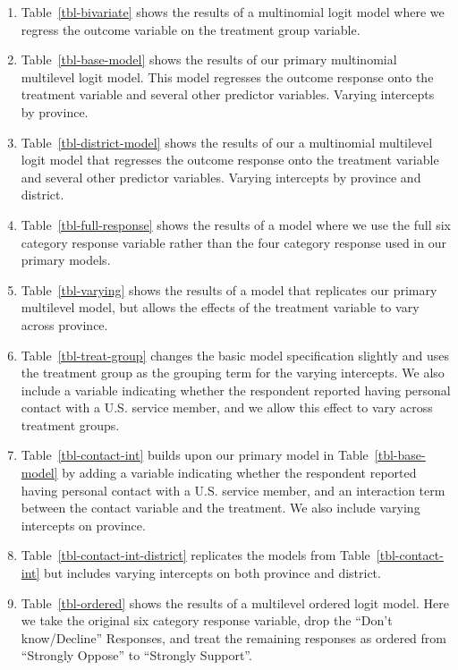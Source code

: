 \documentclass[
  10,
  letterpaper,
  DIV=11,
  numbers=noendperiod]{scrartcl}
\providecommand{\tightlist}{%
  \setlength{\itemsep}{0pt}\setlength{\parskip}{0pt}}\usepackage{longtable,booktabs,array}
\begin{document}
\begin{enumerate}
\def\labelenumi{\arabic{enumi}.}
\tightlist
\item
  Table~\ref{tbl-bivariate} shows the results of a multinomial logit
  model where we regress the outcome variable on the treatment group
  variable.
\item
  Table~\ref{tbl-base-model} shows the results of our primary
  multinomial multilevel logit model. This model regresses the outcome
  response onto the treatment variable and several other predictor
  variables. Varying intercepts by province.
\item
  Table~\ref{tbl-district-model} shows the results of our a multinomial
  multilevel logit model that regresses the outcome response onto the
  treatment variable and several other predictor variables. Varying
  intercepts by province and district.
\item
  Table~\ref{tbl-full-response} shows the results of a model where we
  use the full six category response variable rather than the four
  category response used in our primary models.
\item
  Table~\ref{tbl-varying} shows the results of a model that replicates
  our primary multilevel model, but allows the effects of the treatment
  variable to vary across province.
\item
  Table~\ref{tbl-treat-group} changes the basic model specification
  slightly and uses the treatment group as the grouping term for the
  varying intercepts. We also include a variable indicating whether the
  respondent reported having personal contact with a U.S. service
  member, and we allow this effect to vary across treatment groups.
\item
  Table~\ref{tbl-contact-int} builds upon our primary model in
  Table~\ref{tbl-base-model} by adding a variable indicating whether the
  respondent reported having personal contact with a U.S. service
  member, and an interaction term between the contact variable and the
  treatment. We also include varying intercepts on province.
\item
  Table~\ref{tbl-contact-int-district} replicates the models from
  Table~\ref{tbl-contact-int} but includes varying intercepts on both
  province and district.
\item
  Table~\ref{tbl-ordered} shows the results of a multilevel ordered
  logit model. Here we take the original six category response variable,
  drop the ``Don't know/Decline'' Responses, and treat the remaining
  responses as ordered from ``Strongly Oppose'' to ``Strongly Support''.
\end{enumerate}
\end{document}
